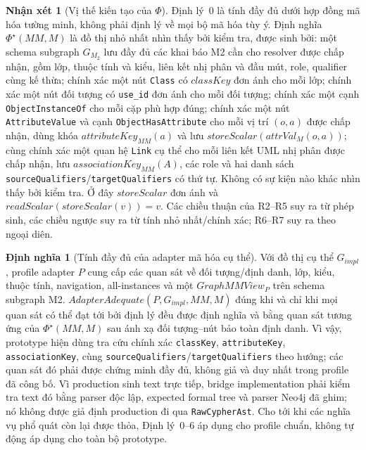 \documentclass[11pt,a4paper]{article}
\theoremstyle{definition}
\newtheorem{definition}{Định nghĩa}
\newtheorem{remark}{Nhận xét}
\begin{document}
\begin{remark}[Vị thế kiến tạo của $\Phi$]
Định lý~0 là tính đầy đủ dưới hợp đồng mã hóa tường minh, không phải định lý về
mọi bộ mã hóa tùy ý. Định nghĩa $\Phi^{\star}(MM,M)$ là đồ thị nhỏ nhất nhìn
thấy bởi kiểm tra, được sinh bởi: một schema subgraph $G_{M_2}$ lưu đầy đủ các
khai báo M2 cần cho resolver được chấp nhận, gồm lớp, thuộc tính và kiểu, liên
kết nhị phân và đầu mút, role, qualifier cùng kế thừa; chính xác một nút
\texttt{Class} có
$classKey$ đơn ánh cho mỗi lớp; chính xác một nút đối tượng có
\texttt{use\_id} đơn ánh cho mỗi đối tượng; chính xác một cạnh
\texttt{ObjectInstanceOf} cho mỗi cặp phù hợp đúng; chính xác một nút
\texttt{AttributeValue} và cạnh \texttt{ObjectHasAttribute} cho mỗi vị trí
$(o,a)$ được chấp nhận, dùng khóa $attributeKey_{MM}(a)$ và lưu
$storeScalar(attrVal_M(o,a))$; cùng chính xác một quan hệ \texttt{Link} cụ thể
cho mỗi liên kết UML nhị phân được chấp nhận, lưu $associationKey_{MM}(A)$,
các role và hai danh sách \texttt{sourceQualifiers}/\texttt{targetQualifiers}
có thứ tự. Không có sự kiện nào khác nhìn thấy
bởi kiểm tra. Ở đây $storeScalar$ đơn ánh và
$readScalar(storeScalar(v))=v$. Các chiều thuận của R2--R5 suy ra từ phép sinh,
các chiều ngược suy ra từ tính nhỏ nhất/chính xác; R6--R7 suy ra theo ngoại diên.
\end{remark}

\begin{definition}[Tính đầy đủ của adapter mã hóa cụ thể]
Với đồ thị cụ thể $G_{impl}$, profile adapter $P$ cung cấp các quan sát về đối
tượng/định danh, lớp, kiểu, thuộc tính, navigation, all-instances và một
$GraphMMView_P$ trên schema subgraph M2.
$AdapterAdequate(P,G_{impl},MM,M)$ đúng khi và chỉ khi mọi quan sát có thể đạt
tới bởi định lý đều được định nghĩa và bằng quan sát tương ứng của
$\Phi^{\star}(MM,M)$ sau ánh xạ đối tượng--nút bảo toàn định danh. Vì vậy,
prototype hiện dùng tra cứu chính xác \texttt{classKey},
\texttt{attributeKey}, \texttt{associationKey}, cùng
\texttt{sourceQualifiers}/\texttt{targetQualifiers} theo hướng; các quan sát đó
phải được chứng minh đầy đủ, không giả và duy nhất trong profile đã công bố.
Vì production sinh text trực tiếp, bridge implementation phải kiểm tra text đó
bằng parser độc lập, expected formal tree và parser Neo4j đã ghim; nó không được
giả định production đi qua \texttt{RawCypherAst}. Cho tới khi các nghĩa vụ phổ
quát còn lại được thỏa, Định lý~0--6 áp dụng cho profile chuẩn, không tự động áp
dụng cho toàn bộ prototype.
\end{definition}
\end{document}
